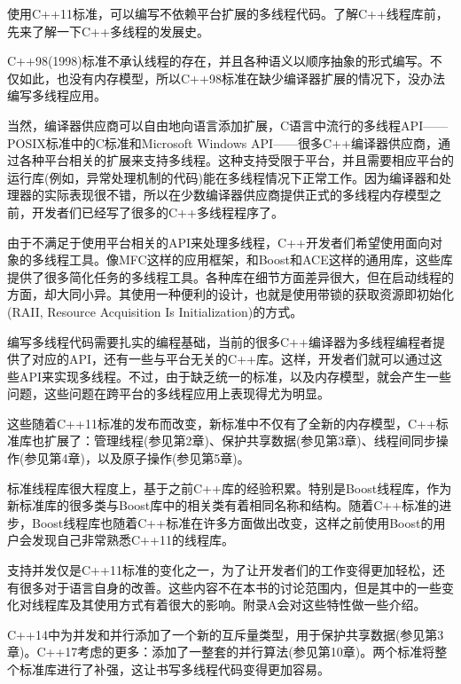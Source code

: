 使用C++11标准，可以编写不依赖平台扩展的多线程代码。了解C++线程库前，先来了解一下C++多线程的发展史。


C++98(1998)标准不承认线程的存在，并且各种语义以顺序抽象的形式编写。不仅如此，也没有内存模型，所以C++98标准在缺少编译器扩展的情况下，没办法编写多线程应用。

当然，编译器供应商可以自由地向语言添加扩展，C语言中流行的多线程API——POSIX标准中的C标准和Microsoft Windows API——很多C++编译器供应商，通过各种平台相关的扩展来支持多线程。这种支持受限于平台，并且需要相应平台的运行库(例如，异常处理机制的代码)能在多线程情况下正常工作。因为编译器和处理器的实际表现很不错，所以在少数编译器供应商提供正式的多线程内存模型之前，开发者们已经写了很多的C++多线程程序了。

由于不满足于使用平台相关的API来处理多线程，C++开发者们希望使用面向对象的多线程工具。像MFC这样的应用框架，和Boost和ACE这样的通用库，这些库提供了很多简化任务的多线程工具。各种库在细节方面差异很大，但在启动线程的方面，却大同小异。其使用一种便利的设计，也就是使用带锁的获取资源即初始化(RAII, Resource Acquisition Is Initialization)的方式。

编写多线程代码需要扎实的编程基础，当前的很多C++编译器为多线程编程者提供了对应的API，还有一些与平台无关的C++库。这样，开发者们就可以通过这些API来实现多线程。不过，由于缺乏统一的标准，以及内存模型，就会产生一些问题，这些问题在跨平台的多线程应用上表现得尤为明显。


这些随着C++11标准的发布而改变，新标准中不仅有了全新的内存模型，C++标准库也扩展了：管理线程(参见第2章)、保护共享数据(参见第3章)、线程间同步操作(参见第4章)，以及原子操作(参见第5章)。

标准线程库很大程度上，基于之前C++库的经验积累。特别是Boost线程库，作为新标准库的很多类与Boost库中的相关类有着相同名称和结构。随着C++标准的进步，Boost线程库也随着C++标准在许多方面做出改变，这样之前使用Boost的用户会发现自己非常熟悉C++11的线程库。

支持并发仅是C++11标准的变化之一，为了让开发者们的工作变得更加轻松，还有很多对于语言自身的改善。这些内容不在本书的讨论范围内，但是其中的一些变化对线程库及其使用方式有着很大的影响。附录A会对这些特性做一些介绍。


C++14中为并发和并行添加了一个新的互斥量类型，用于保护共享数据(参见第3章)。C++17考虑的更多：添加了一整套的并行算法(参见第10章)。两个标准将整个标准库进行了补强，这让书写多线程代码变得更加容易。

